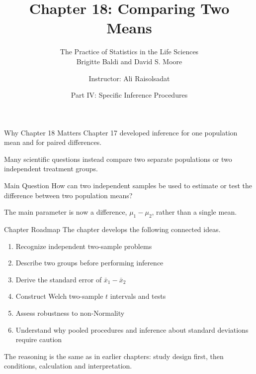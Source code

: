 \documentclass[aspectratio=169,10pt]{beamer}
\title[Chapter 18: Comparing Two Means]{\textbf{Chapter 18: Comparing Two Means}}
\subtitle{The Practice of Statistics in the Life Sciences \\ Brigitte Baldi and David S. Moore}
\author{Instructor: Ali Raisolsadat}
\date{Part IV: Specific Inference Procedures}
\begin{document}

\begin{frame}
  \titlepage
\end{frame}

\begin{frame}{Why Chapter 18 Matters}
Chapter 17 developed inference for one population mean and for paired differences.

\vspace{0.25cm}
Many scientific questions instead compare two separate populations or two independent treatment groups.

\begin{block}{Main Question}
How can two independent samples be used to estimate or test the difference between two population means?
\end{block}

The main parameter is now a difference, $\mu_1-\mu_2$, rather than a single mean.
\end{frame}

\begin{frame}{Chapter Roadmap}
The chapter develops the following connected ideas.

\begin{enumerate}
  \item Recognize independent two-sample problems
  \item Describe two groups before performing inference
  \item Derive the standard error of $\bar{x}_1-\bar{x}_2$
  \item Construct Welch two-sample $t$ intervals and tests
  \item Assess robustness to non-Normality
  \item Understand why pooled procedures and inference about standard deviations require caution
\end{enumerate}

The reasoning is the same as in earlier chapters: study design first, then conditions, calculation and interpretation.
\end{frame}
\end{document}
